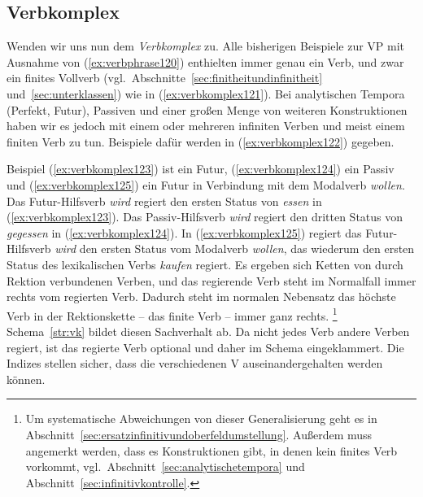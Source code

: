 \Stretch

\subsection{Verbkomplex}
\label{sec:verbkomplex}


Wenden wir uns nun dem \textit{Verbkomplex} zu.
Alle bisherigen Beispiele zur VP mit Ausnahme von (\ref{ex:verbphrase120}) enthielten immer genau ein Verb, und zwar ein finites Vollverb (vgl.\ Abschnitte~\ref{sec:finitheitundinfinitheit} und~\ref{sec:unterklassen}) wie in (\ref{ex:verbkomplex121}).
Bei analytischen Tempora (Perfekt, Futur), Passiven und einer großen Menge von weiteren Konstruktionen haben wir es jedoch mit einem oder mehreren infiniten Verben und meist einem finiten Verb zu tun.
Beispiele dafür werden in (\ref{ex:verbkomplex122}) gegeben.

\Stretch[0.5]

\begin{exe}
  \ex\label{ex:verbkomplex122}
  \begin{xlist}
  \end{xlist}
\end{exe}

\Stretch[0.5]

Beispiel (\ref{ex:verbkomplex123}) ist ein Futur, (\ref{ex:verbkomplex124}) ein Passiv und (\ref{ex:verbkomplex125}) ein Futur in Verbindung mit dem Modalverb \textit{wollen}.
Das Futur-Hilfsverb \textit{wird} regiert den ersten Status von \textit{essen} in (\ref{ex:verbkomplex123}).
Das Passiv-Hilfsverb \textit{wird} regiert den dritten Status von \textit{gegessen} in (\ref{ex:verbkomplex124}).
In (\ref{ex:verbkomplex125}) regiert das Futur-Hilfsverb \textit{wird} den ersten Status vom Modalverb \textit{wollen}, das wiederum den ersten Status des lexikalischen Verbs \textit{kaufen} regiert.
Es ergeben sich Ketten von durch Rektion verbundenen Verben, und das regierende Verb steht im Normalfall immer rechts vom regierten Verb.
Dadurch steht im normalen Nebensatz das höchste Verb in der Rektionskette -- das finite Verb -- immer ganz rechts.%
\footnote{Um systematische Abweichungen von dieser Generalisierung geht es in Abschnitt~\ref{sec:ersatzinfinitivundoberfeldumstellung}.
Außerdem muss angemerkt werden, dass es Konstruktionen gibt, in denen kein finites Verb vorkommt, vgl.\ Abschnitt~\ref{sec:analytischetempora} und Abschnitt~\ref{sec:infinitivkontrolle}.}
Schema~\ref{str:vk} bildet diesen Sachverhalt ab.
Da nicht jedes Verb andere Verben regiert, ist das regierte Verb optional und daher im Schema eingeklammert.
Die Indizes stellen sicher, dass die verschiedenen V auseinandergehalten werden können.

